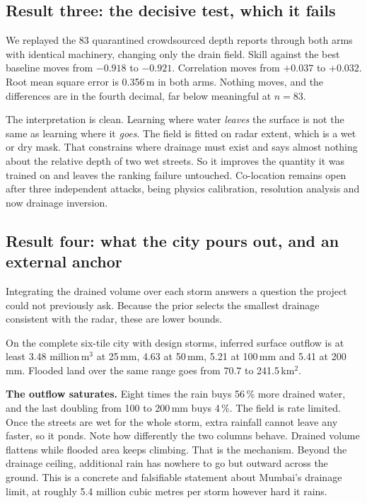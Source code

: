 \subsection{Result three: the decisive test, which it fails}
We replayed the 83 quarantined crowdsourced depth reports through both arms with identical
machinery, changing only the drain field. Skill against the best baseline moves from $-0.918$ to
$-0.921$. Correlation moves from $+0.037$ to $+0.032$. Root mean square error is 0.356\,m in both
arms. Nothing moves, and the differences are in the fourth decimal, far below meaningful at
$n = 83$.

The interpretation is clean. Learning where water \emph{leaves} the surface is not the same as
learning where it \emph{goes}. The field is fitted on radar extent, which is a wet or dry mask. That
constrains where drainage must exist and says almost nothing about the relative depth of two wet
streets. So it improves the quantity it was trained on and leaves the ranking failure untouched.
Co-location remains open after three independent attacks, being physics calibration, resolution
analysis and now drainage inversion.

\subsection{Result four: what the city pours out, and an external anchor}
Integrating the drained volume over each storm answers a question the project could not previously
ask. Because the prior selects the smallest drainage consistent with the radar, these are lower
bounds.

On the complete six-tile city with design storms, inferred surface outflow is at least
3.48 million\,m$^3$ at 25\,mm, 4.63 at 50\,mm, 5.21 at 100\,mm and 5.41 at 200\,mm. Flooded land
over the same range goes from 70.7 to 241.5\,km$^2$.

\textbf{The outflow saturates.} Eight times the rain buys 56\,\% more drained water, and the last
doubling from 100 to 200\,mm buys 4\,\%. The field is rate limited. Once the streets are wet for
the whole storm, extra rainfall cannot leave any faster, so it ponds. Note how differently the two
columns behave. Drained volume flattens while flooded area keeps climbing. That is the mechanism.
Beyond the drainage ceiling, additional rain has nowhere to go but outward across the ground. This
is a concrete and falsifiable statement about Mumbai's drainage limit, at roughly 5.4 million cubic
metres per storm however hard it rains.

